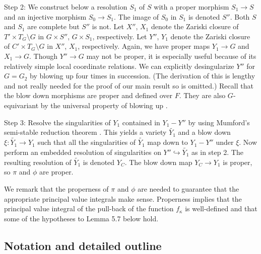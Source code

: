 \documentclass[12pt,letterpaper]{amsart}
\begin{document}
\noindent
Step 2: We construct below a resolution $S_1$ of $S$ with a proper
morphism $S_1\rightarrow S$ and an injective morphism
$S_0\rightarrow S_1$. The image of $S_0$ in $S_1$ is denoted $S''$.
Both $S$ and $S_1$ are complete but $S''$ is not.
Let $X''$, $X_1$ denote the Zariski closure of $T'\times T_G\setminus G$
in $G\times S''$, $G\times S_1$, respectively.
Let $Y''$, $Y_1$ denote the Zariski closure of $C'\times T_G\setminus G$
in $X''$, $X_1$, respectively. Again, we have proper maps
$Y_1\rightarrow G$ and $X_1\rightarrow G$. Though $Y''\rightarrow G$
may not be proper, it is especially useful because
of its relatively simple local coordinate relations. We can explicitly
desingularize $Y''$ for $G=G_2$ by blowing up four
times in succession.
(The derivation of this is lengthy and not really needed for the
proof of our main result so is omitted.)
Recall that the blow down morphisms
are proper and defined over $F$. They are also $G$-equivariant
by the universal property of blowing up \cite{Har77}.

\noindent
Step 3: Resolve the singularities of $Y_1$ contained in
$Y_1-Y''$ by using Mumford's semi-stable reduction theorem \cite{Ke72}.
This yields a variety $\tilde{Y_1}$ and a blow down
$\xi:\tilde{Y_1}\rightarrow Y_1$ such that all the singularities
of $\tilde{Y_1}$ map down to $Y_1- Y''$ under $\xi$. Now
perform an embedded resolution of singularities on
$Y''\hookrightarrow \tilde{Y_1}$ as in step 2. The resulting
resolution of $\tilde{Y_1}$
is denoted $Y_C$. The blow down map $Y_C\rightarrow Y_1$
is proper, so $\pi$ and $\phi$ are proper.

We remark that the properness of $\pi$ and
$\phi$ are needed to guarantee that the appropriate
principal value integrals make sense. Properness implies that
the principal value integral of the
pull-back of the function $f_\kappa$ is well-defined
and that some of the hypotheses to Lemma 5.7 below hold.

\subsection*{Notation and detailed outline}
\end{document}
